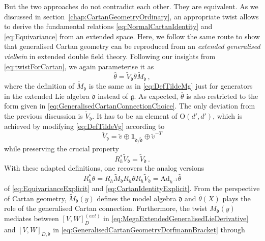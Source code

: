 \documentclass[11pt,a4paper]{article}
\numberwithin{equation}{section}
\begin{document}
But the two approaches do not contradict each other. They are equivalent. As we discussed in section~\ref{chap:CartanGeometryOrdinary}, an appropriate twist allows to derive the fundamental relations \eqref{eq:NormalCartanIdentity} and \eqref{eq:Equivariance} from an extended space. Here, we follow the same route to show that generalised Cartan geometry can be reproduced from an \textit{extended generalised vielbein} in extended double field theory. Following our insights from \eqref{eq:twistForCartan}, we again parameterise it as%
\begin{equation}
  \widehat{\theta} = \widetilde{V}_{\mathfrak{d}} \overline{\theta} \widetilde{M}_{\mathfrak{d}}\,, \label{eq:MegaExtendedVielbein}
\end{equation}
where the definition of $\widetilde{M}_{\mathfrak{d}}$ is the same as in \eqref{eq:DefTildeMg} just for generators in the extended Lie algebra $\mathfrak{d}$ instead of $\mathfrak{g}$. As expected, $\overline{\theta}$ is also restricted to the form given in \eqref{eq:GeneralisedCartanConnectionChoice}. The only deviation from the previous discussion is $\widetilde{V}_{\mathfrak{d}}$. It has to be an element of O$(d',d')$, which is achieved by modifying \eqref{eq:DefTildeVg} according to
\begin{equation}
  \widetilde{V}_{\mathfrak{d}} = \widetilde{v} \oplus \mathbf{1}_{\mathfrak{d}/\tilde{\mathfrak{d}}} \oplus \widetilde{v}^{-T}
\end{equation}
while preserving the crucial property
\begin{equation}
  R_h^* \widetilde{V}_{\mathfrak{d}} = \widetilde{V}_{\mathfrak{d}}\,.
\end{equation}
With these adapted definitions, one recovers the analog versions
\begin{equation}
  R^*_h \widehat{\theta} = R_h \widetilde{M}_{\mathfrak{d}} R_h \overline{\theta} R_h \widetilde{V}_{\mathfrak{d}} = \mathrm{Ad}_{h^{-1}} \widehat{\theta}
\end{equation}
of \eqref{eq:EquivarianceExplicit} and \eqref{eq:CartanIdentityExplicit}.  From the perspective of Cartan geometry, $\widetilde{M}_{\mathfrak{d}}(y)$ defines the model algebra $\mathfrak{d}$ and $\overline{\theta}(X)$ plays the role of the generalised Cartan connection. Furthermore, the twist $M_{\mathfrak{d}}(y)$ mediates between $[V,W]^{(ext)}_D$ in \eqref{eq:MegaExtendedGeneralisedLieDerivative} and $[V,W]_{D,\mathfrak{d}}$ in \eqref{eq:GeneralisedCartanGeometryDorfmannBracket} through
\end{document}
